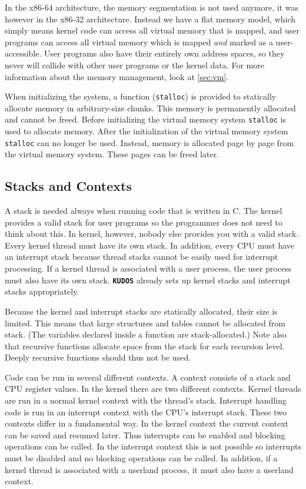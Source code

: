 \documentclass[twoside,a4paper]{report}
\newcommand{\kudos}{\texttt{\textbf{KUDOS}}}
\begin{document}
In the x86-64 architecture, the memory segmentation is not used
anymore, it was however in the x86-32 architecture. Instead we have
a flat memory model, which simply means kernel code can access all virtual
memory that is mapped, and user programs can access all virtual memory
which is mapped \emph{and} marked as a user-accessible. User programs
also have their entirely own address spaces, so they never will collide with
other user programs or the kernel data. For more information about the 
memory management, look at \autoref{sec:vm}.

When initializing the system, a function (\texttt{stalloc})
 is provided to statically allocate memory in
arbitrary-size chunks. This memory is permanently allocated and cannot
be freed. Before initializing the virtual memory system
\texttt{stalloc} is used to allocate memory. After the initialization
of the virtual memory system \texttt{stalloc} can no longer be used.
Instead, memory is allocated page by page from the virtual memory
system. These pages can be freed later.

\subsection{Stacks and Contexts}


A stack is needed always when running code that is written in C. The
kernel provides a valid stack for user programs so the programmer does
not need to think about this. In kernel, however, nobody else provides
you with a valid stack. Every kernel thread must have its own stack.
In addition, every CPU must have an interrupt stack because thread
stacks cannot be easily used for interrupt processing. If a kernel
thread is associated with a user process, the user process must also
have its own stack. \kudos{} already sets up kernel stacks and
interrupt stacks appropriately.

Because the kernel and interrupt stacks are statically allocated,
their size is limited. This means that large structures and tables
cannot be allocated from stack. (The variables declared inside a
function are stack-allocated.) Note also that recursive functions
allocate space from the stack for each recursion level. Deeply
recursive functions should thus not be used.


Code can be run in several different contexts. A context consists of a
stack and CPU register values. In the kernel there are two different
contexts. Kernel threads are run in a normal kernel context with the
thread's stack. Interrupt handling code is run in an interrupt context
with the CPU's interrupt stack. These two contexts differ in a
fundamental way. In the kernel context the current context can be
saved and resumed later. Thus interrupts can be enabled and blocking
operations can be called. In the interrupt context this is not
possible so interrupts must be disabled and no blocking operations can
be called. In addition, if a kernel thread is associated with a
userland process, it must also have a userland context.
\end{document}
